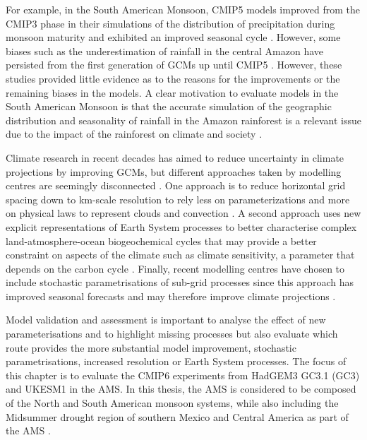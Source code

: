 For example, in the South American Monsoon, CMIP5 models improved from the CMIP3 phase in their simulations of the distribution of precipitation during monsoon maturity and exhibited an improved seasonal cycle \citep{jones2013,yin2013}. However, some biases such as the underestimation of rainfall in the central Amazon have persisted from the first generation of GCMs up until CMIP5 \citep{li2006,yin2013}.  However, these studies provided little evidence as to the reasons for the improvements or the remaining biases in the models. 
A clear motivation to evaluate models in the South American Monsoon is that the accurate simulation of the geographic distribution and seasonality of rainfall in the Amazon rainforest is a relevant issue due to the impact of the rainforest on climate and society \citep[e.g.][]{li2006,malhi2009,yin2013}.

Climate research in recent decades has aimed to reduce uncertainty in climate projections by improving GCMs, but different approaches taken by modelling centres are seemingly disconnected \citep{jakob2014}. One approach is to reduce horizontal grid spacing down to km-scale resolution to rely less on parameterizations and more on physical laws to represent clouds and convection \citep{palmer2019}. A second approach uses new explicit representations of Earth System processes to better characterise complex land-atmosphere-ocean biogeochemical cycles that may provide a better constraint on aspects of the climate such as climate sensitivity, a parameter that depends on the carbon cycle \citep{marotzke2017,sellar2019,andrews2019}. Finally, recent modelling centres have chosen to include  stochastic  parametrisations of sub-grid processes since this approach has improved seasonal forecasts and may therefore improve climate projections \citep{palmer2019st}. 

Model validation and assessment is important to analyse the effect of new parameterisations and to highlight missing processes but also evaluate which route provides the more substantial model improvement, stochastic parametrisations, increased resolution or Earth System processes.
The focus of this chapter is to evaluate the CMIP6 experiments from HadGEM3 GC3.1 (GC3) and UKESM1 in the AMS. In this thesis, the AMS is considered to be composed of the North and South American monsoon systems, while also including the Midsummer drought region of southern Mexico and Central America as part of the AMS \citep[as in e.g.][]{vera2006,pascale2019}.

